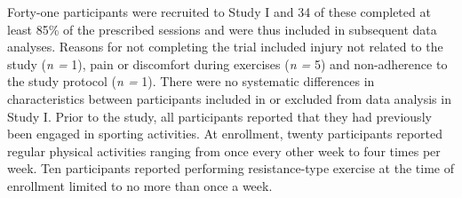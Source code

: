\documentclass[twoside,10pt]{gihclass} %
\begin{document}
Forty-one participants were recruited to Study I and 34 of these completed at least 85\% of the prescribed sessions and were thus included in subsequent data analyses. Reasons for not completing the trial included injury not related to the study (\emph{n =} 1), pain or discomfort during exercises (\emph{n =} 5) and non-adherence to the study protocol (\emph{n =} 1). There were no systematic differences in characteristics between participants included in or excluded from data analysis in Study I. Prior to the study, all participants reported that they had previously been engaged in sporting activities. At enrollment, twenty participants reported regular physical activities ranging from once every other week to four times per week. Ten participants reported performing resistance-type exercise at the time of enrollment limited to no more than once a week.
\end{document}

